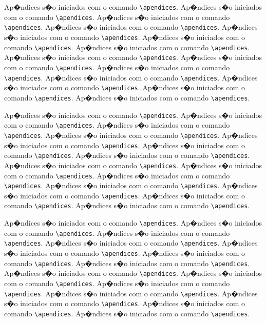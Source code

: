 Ap�ndices s�o iniciados com o comando \verb|\apendices|.
Ap�ndices s�o iniciados com o comando \verb|\apendices|.
Ap�ndices s�o iniciados com o comando \verb|\apendices|.
Ap�ndices s�o iniciados com o comando \verb|\apendices|.
Ap�ndices s�o iniciados com o comando \verb|\apendices|.
Ap�ndices s�o iniciados com o comando \verb|\apendices|.
Ap�ndices s�o iniciados com o comando \verb|\apendices|.
Ap�ndices s�o iniciados com o comando \verb|\apendices|.
Ap�ndices s�o iniciados com o comando \verb|\apendices|.
Ap�ndices s�o iniciados com o comando \verb|\apendices|.
Ap�ndices s�o iniciados com o comando \verb|\apendices|.
Ap�ndices s�o iniciados com o comando \verb|\apendices|.
Ap�ndices s�o iniciados com o comando \verb|\apendices|.
Ap�ndices s�o iniciados com o comando \verb|\apendices|.

Ap�ndices s�o iniciados com o comando \verb|\apendices|.
Ap�ndices s�o iniciados com o comando \verb|\apendices|.
Ap�ndices s�o iniciados com o comando \verb|\apendices|.
Ap�ndices s�o iniciados com o comando \verb|\apendices|.
Ap�ndices s�o iniciados com o comando \verb|\apendices|.
Ap�ndices s�o iniciados com o comando \verb|\apendices|.
Ap�ndices s�o iniciados com o comando \verb|\apendices|.
Ap�ndices s�o iniciados com o comando \verb|\apendices|.
Ap�ndices s�o iniciados com o comando \verb|\apendices|.
Ap�ndices s�o iniciados com o comando \verb|\apendices|.
Ap�ndices s�o iniciados com o comando \verb|\apendices|.
Ap�ndices s�o iniciados com o comando \verb|\apendices|.
Ap�ndices s�o iniciados com o comando \verb|\apendices|.
Ap�ndices s�o iniciados com o comando \verb|\apendices|.

Ap�ndices s�o iniciados com o comando \verb|\apendices|.
Ap�ndices s�o iniciados com o comando \verb|\apendices|.
Ap�ndices s�o iniciados com o comando \verb|\apendices|.
Ap�ndices s�o iniciados com o comando \verb|\apendices|.
Ap�ndices s�o iniciados com o comando \verb|\apendices|.
Ap�ndices s�o iniciados com o comando \verb|\apendices|.
Ap�ndices s�o iniciados com o comando \verb|\apendices|.
Ap�ndices s�o iniciados com o comando \verb|\apendices|.
Ap�ndices s�o iniciados com o comando \verb|\apendices|.
Ap�ndices s�o iniciados com o comando \verb|\apendices|.
Ap�ndices s�o iniciados com o comando \verb|\apendices|.
Ap�ndices s�o iniciados com o comando \verb|\apendices|.
Ap�ndices s�o iniciados com o comando \verb|\apendices|.
Ap�ndices s�o iniciados com o comando \verb|\apendices|.
